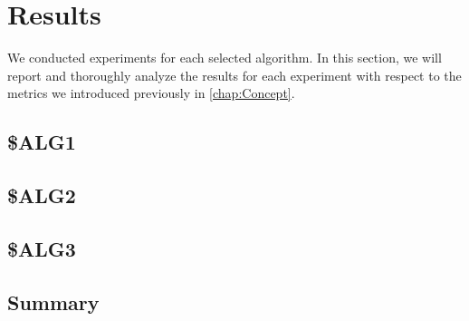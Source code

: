 \documentclass[main.tex]{subfiles}
\begin{document}
\section{Results}\label{ev-res}
We conducted experiments for each selected algorithm. In this section, we will report and thoroughly analyze the results for each experiment with respect to the metrics we introduced previously in \ref{chap:Concept}.
\subsection{\$ALG1}
\subsection{\$ALG2}
\subsection{\$ALG3}
\subsection*{Summary}
\end{document}
